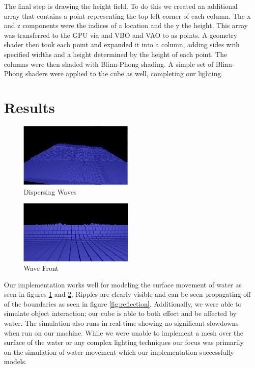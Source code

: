 \documentclass[12pt,notitlepage]{article}
\begin{document}
The final step is drawing the height field.  To do this we created an additional array that contains a point representing the top left corner of each column.  The x and z components were the indices of a location and the y the height.  This array was transferred to the GPU via and VBO and VAO to as points.  A geometry shader then took each point and expanded it into a column, adding sides with specified widths and a height determined by the height of each point.  The columns were then shaded with Blinn-Phong shading.  A simple set of Blinn-Phong shaders were applied to the cube as well, completing our lighting.

\section{Results}

\begin{figure}[H]
    \caption{Dispersing Waves}
    \label{fig:waves}
    \centering
    \includegraphics[width=0.5\textwidth]{../www/images/waterWaves}
\end{figure}

\begin{figure}[H]
    \caption{Wave Front}
    \label{fig:front}
    \centering
    \includegraphics[width=0.5\textwidth]{../www/images/waveFront}
\end{figure}

Our implementation works well for modeling the surface movement of water as 
seen in figures \ref{fig:waves} and \ref{fig:front}. Ripples are clearly 
visible and can be seen propagating off of the boundaries as seen in figure 
\ref{fig:reflection}. Additionally, we were able to simulate object 
interaction; our cube is able to both effect and be affected by water.  The 
simulation also runs in real-time showing no significant slowdowns when run on 
our machine. While we were unable to implement a mesh over the surface of the 
water or any complex lighting techniques our focus was primarily on the 
simulation of water movement which our implementation successfully models.
\end{document}

